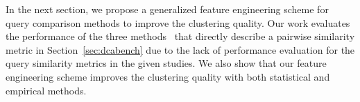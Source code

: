 In the next section, we propose a generalized feature engineering scheme for query comparison methods to improve the clustering quality.
Our work evaluates the performance of the three methods~\cite{aouiche2006, aligon2014similarity, makiyama2015text} that directly describe a pairwise similarity metric in Section~\ref{sec:dcabench} due to the lack of performance evaluation for the query similarity metrics in the given studies.
We also show that our feature engineering scheme improves the clustering quality with both statistical and empirical methods.







